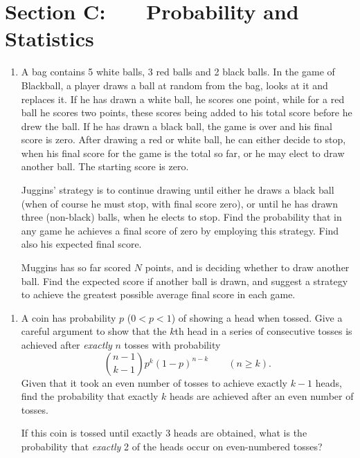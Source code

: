 \documentclass[a4, 11pt]{report}
\newlength{\qspace}
\newcounter{qnumber}
\newenvironment{question}%
 {\vspace{\qspace}
  \begin{enumerate}[\bfseries 1\quad][10]%
    \setcounter{enumi}{\value{qnumber}}%
    \item%
 }
{
  \end{enumerate}
  \filbreak
  \stepcounter{qnumber}
 }
\begin{document}
	\newpage
\section*{Section C: \ \ \ Probability and Statistics}


\begin{question}
A bag contains 5 white balls, 3 red balls and 2 black balls. In the
game of Blackball, a player draws a ball at random from the bag, looks
at it and replaces it. If he has drawn a white ball, he scores one
point, while for a red ball he scores two points, these scores being
added to his total score before he drew the ball. If he has drawn
a black ball, the game is over and his final score is zero. After
drawing a red or white ball, he can either decide to stop, when his
final score for the game is the total so far, or he may elect to draw
another ball. The starting score is zero. 


Juggins' strategy is to continue drawing until either he draws a black
ball (when of course he must stop, with final score zero), or until
he has drawn three (non-black) balls, when he elects to stop. Find
the probability that in any game he achieves a final score of zero
by employing this strategy. Find also his expected final score. 


Muggins has so far scored $N$ points, and is deciding whether to
draw another ball. Find the expected score if another ball is drawn,
and suggest a strategy to achieve the greatest possible average final
score in each game. 

\end{question}

\begin{question}
A coin has probability $p$ ($0<p<1$) of showing a head when tossed.
Give a careful argument to show that the $k$th head in a series of
consecutive tosses is achieved after \textit{exactly }$n$ tosses
with probability 
\[
\binom{n-1}{k-1}p^{k}(1-p)^{n-k}\qquad(n\geqslant k).
\]
Given that it took an even number of tosses to achieve exactly $k-1$
heads, find the probability that exactly $k$ heads are achieved after
an even number of tosses. 


If this coin is tossed until exactly 3 heads are obtained, what is
the probability that \textit{exactly }2 of the heads occur on even-numbered
tosses? 
\end{question}
\end{document}
